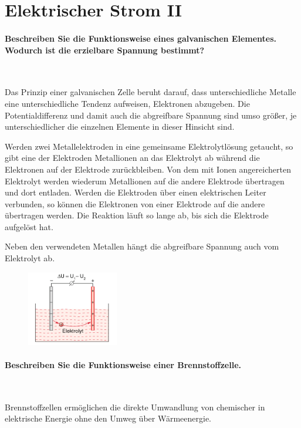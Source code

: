 \documentclass[a4paper, 11pt, ngerman, parskip=half-]{scrartcl}
\begin{document}
\newpage

\section{Elektrischer Strom II}

\paragraph{Beschreiben Sie die Funktionsweise eines galvanischen Elementes. Wodurch ist die
    erzielbare Spannung bestimmt?} ~

Das Prinzip einer galvanischen Zelle beruht darauf, dass unterschiedliche Metalle eine
unterschiedliche Tendenz aufweisen, Elektronen abzugeben. Die Potentialdifferenz und damit auch die
abgreifbare Spannung sind umso größer, je unterschiedlicher die einzelnen Elemente in dieser Hinsicht
sind.

Werden zwei Metallelektroden in eine gemeinsame Elektrolytlösung getaucht, so gibt eine der
Elektroden Metallionen an das Elektrolyt ab während die Elektronen auf der Elektrode zurückbleiben.
Von dem mit Ionen angereicherten Elektrolyt werden wiederum Metallionen auf die andere Elektrode
übertragen und dort entladen. Werden die Elektroden über einen elektrischen Leiter verbunden, so
können die Elektronen von einer Elektrode auf die andere übertragen werden. Die Reaktion läuft so
lange ab, bis sich die Elektrode aufgelöst hat.

Neben den verwendeten Metallen hängt die abgreifbare Spannung auch vom Elektrolyt ab.

\begin{figure}[H]
    \centering
    \includegraphics[width=4cm]{image/04/1}
\end{figure}

\paragraph{Beschreiben Sie die Funktionsweise einer Brennstoffzelle.} ~

Brennstoffzellen ermöglichen die direkte Umwandlung von chemischer in elektrische Energie ohne den
Umweg über Wärmeenergie.
\end{document}

